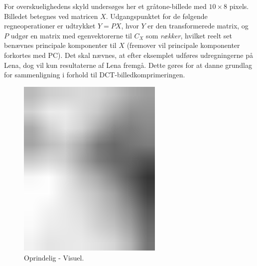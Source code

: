 For overskuelighedens skyld undersøges her et gråtone-billede med $10 \times 8$ pixels. Billedet betegnes ved matricen $X$. Udgangspunktet for de følgende regneoperationer er udtrykket $Y = PX$, hvor $Y$ er den transformerede matrix, og $P$ udgør en matrix med egenvektorerne til $C_X$ som \emph{rækker}, hvilket reelt set benævnes principale komponenter til $X$ (fremover vil principale komponenter forkortes med PC). Det skal nævnes, at efter eksemplet udføres udregningerne på Lena, dog vil kun resultaterne af Lena fremgå. Dette gøres for at danne grundlag for sammenligning i forhold til DCT-billedkomprimeringen.
\begin{figure}[!h]
\begin{minipage}[b]{0.27\linewidth}
\centering
\includegraphics[width=0.62\textwidth]{Billeder/LenaAnvendelse/testBillede/testBillede1.png}
\caption{Oprindelig - Visuel.}
\label{fig:X_anvendelse-tal-start}
\end{minipage}
\hspace{0.5cm}
\end{figure}

